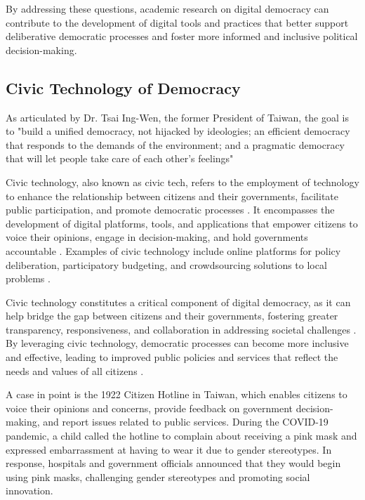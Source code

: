 \documentclass{IEEEtran}
\begin{document}
By addressing these questions, academic research on digital democracy can contribute to the development of digital tools and practices that better support deliberative democratic processes and foster more informed and inclusive political decision-making.


\subsection{Civic Technology of Democracy}

As articulated by Dr. Tsai Ing-Wen, the former President of Taiwan, the goal is to "build a unified democracy, not hijacked by ideologies; an efficient democracy that responds to the demands of the environment; and a pragmatic democracy that will let people take care of each other's feelings" 

Civic technology, also known as civic tech, refers to the employment of technology to enhance the relationship between citizens and their governments, facilitate public participation, and promote democratic processes \cite{hollands2015civic}. It encompasses the development of digital platforms, tools, and applications that empower citizens to voice their opinions, engage in decision-making, and hold governments accountable \cite{susha2015civic}. Examples of civic technology include online platforms for policy deliberation, participatory budgeting, and crowdsourcing solutions to local problems \cite{schrock2016civic}.

Civic technology constitutes a critical component of digital democracy, as it can help bridge the gap between citizens and their governments, fostering greater transparency, responsiveness, and collaboration in addressing societal challenges \cite{townsend2013smart}. By leveraging civic technology, democratic processes can become more inclusive and effective, leading to improved public policies and services that reflect the needs and values of all citizens \cite{hollands2015civic}.

A case in point is the 1922 Citizen Hotline in Taiwan, which enables citizens to voice their opinions and concerns, provide feedback on government decision-making, and report issues related to public services. During the COVID-19 pandemic, a child called the hotline to complain about receiving a pink mask and expressed embarrassment at having to wear it due to gender stereotypes. In response, hospitals and government officials announced that they would begin using pink masks, challenging gender stereotypes and promoting social innovation.
\end{document}
